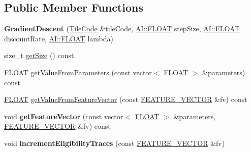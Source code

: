 \subsection*{Public Member Functions}
\begin{DoxyCompactItemize}
\item 
\hypertarget{classAI_1_1Algorithm_1_1GradientDescent_a8432f6a139bfac60422558841e6b79ad}{{\bfseries Gradient\-Descent} (\hyperlink{classAI_1_1Algorithm_1_1TileCode}{Tile\-Code} \&tile\-Code, \hyperlink{namespaceAI_a41b74884a20833db653dded3918e05c3}{A\-I\-::\-F\-L\-O\-A\-T} step\-Size, \hyperlink{namespaceAI_a41b74884a20833db653dded3918e05c3}{A\-I\-::\-F\-L\-O\-A\-T} discount\-Rate, \hyperlink{namespaceAI_a41b74884a20833db653dded3918e05c3}{A\-I\-::\-F\-L\-O\-A\-T} lambda)}\label{classAI_1_1Algorithm_1_1GradientDescent_a8432f6a139bfac60422558841e6b79ad}

\item 
size\-\_\-t \hyperlink{classAI_1_1Algorithm_1_1GradientDescent_a04a6c7f4c2e0046dd70b2cfd98322971}{get\-Size} () const 
\item 
\hyperlink{namespaceAI_a41b74884a20833db653dded3918e05c3}{F\-L\-O\-A\-T} \hyperlink{classAI_1_1Algorithm_1_1GradientDescent_a8dcc60ebf28babbe120fe7b20334380f}{get\-Value\-From\-Parameters} (const vector$<$ \hyperlink{namespaceAI_a41b74884a20833db653dded3918e05c3}{F\-L\-O\-A\-T} $>$ \&parameters) const 
\item 
\hyperlink{namespaceAI_a41b74884a20833db653dded3918e05c3}{F\-L\-O\-A\-T} \hyperlink{classAI_1_1Algorithm_1_1GradientDescent_a19111aa6a83836a2e12e623e4004c4d3}{get\-Value\-From\-Feature\-Vector} (const \hyperlink{namespaceAI_a23a39e1b301a5c1345fa508796940631}{F\-E\-A\-T\-U\-R\-E\-\_\-\-V\-E\-C\-T\-O\-R} \&fv) const 
\item 
\hypertarget{classAI_1_1Algorithm_1_1GradientDescent_a6a625b771afbda36509c2b38843825bf}{void {\bfseries get\-Feature\-Vector} (const vector$<$ \hyperlink{namespaceAI_a41b74884a20833db653dded3918e05c3}{F\-L\-O\-A\-T} $>$ \&parameters, \hyperlink{namespaceAI_a23a39e1b301a5c1345fa508796940631}{F\-E\-A\-T\-U\-R\-E\-\_\-\-V\-E\-C\-T\-O\-R} \&fv) const }\label{classAI_1_1Algorithm_1_1GradientDescent_a6a625b771afbda36509c2b38843825bf}

\item 
\hypertarget{classAI_1_1Algorithm_1_1GradientDescent_a68b6d1772a25ce2d6d98cfd3ab697b02}{void {\bfseries increment\-Eligibility\-Traces} (const \hyperlink{namespaceAI_a23a39e1b301a5c1345fa508796940631}{F\-E\-A\-T\-U\-R\-E\-\_\-\-V\-E\-C\-T\-O\-R} \&fv)}\label{classAI_1_1Algorithm_1_1GradientDescent_a68b6d1772a25ce2d6d98cfd3ab697b02}


\end{DoxyCompactItemize}
